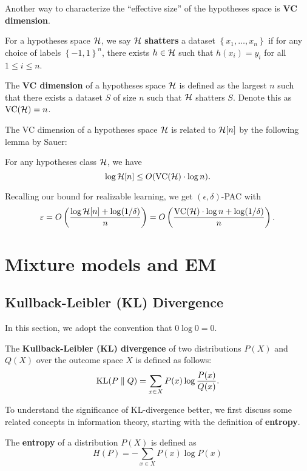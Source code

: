 \documentclass[a4paper]{article}
\begin{document}
Another way to characterize the ``effective size'' of the
hypotheses space is \textbf{VC dimension}.

\begin{defi}[VC dimension]
  For a hypotheses space $\mathcal{H}$, we say
  $\mathcal{H}$ \textbf{shatters} a dataset
  $\left\{ x_1, \dots, x_n \right\}$ if
  for any choice of labels
  $\left\{ -1, 1 \right\}^n$, there exists
  $h \in \mathcal{H}$ such that $h(x_i) = y_i$
  for all $1 \leq i \leq n$.

  The \textbf{VC dimension} of a hypotheses
  space $\mathcal{H}$ is defined
  as the largest $n$ such that there exists a dataset $S$
  of size $n$ such that $\mathcal{H}$ shatters $S$.
  Denote this as $\operatorname{VC}(\mathcal{H}) = n$.
\end{defi}

The VC dimension of a hypotheses space $\mathcal{H}$ is
related to $\mathcal{H}[n]$ by the following lemma by
Sauer:

\begin{thm}
  For any hypotheses class $\mathcal{H}$, we have
  \[
  \log \mathcal{H}[n] \leq O(\operatorname{VC}(\mathcal{H}) \cdot \log n).
  \]
\end{thm}

Recalling our bound for realizable learning, we get
$(\epsilon, \delta)$-PAC with
\[
\varepsilon = O \left( \frac{\log \mathcal{H}[n] + \log (1 / \delta)}{n} \right)
= O \left( \frac{\operatorname{VC}(\mathcal{H}) \cdot \log n + \log (1 / \delta)}{n} \right).
\]




\section{Mixture models and EM}

\subsection{Kullback-Leibler (KL) Divergence}
In this section, we adopt the convention that $0 \log 0 = 0$.

\begin{defi}[KL divergence]
  The \textbf{Kullback-Leibler (KL) divergence} of two
  distributions $P(X)$ and $Q(X)$
  over the outcome space $X$ is defined as follows:
  \[
  \operatorname{KL} (P \; \Vert \; Q) = \sum_{x \in X} P(x) \log \frac{P(x)}{Q(x)}.
  \]
\end{defi}

To understand the significance of KL-divergence better,
we first discuss some related concepts in information theory,
starting with the definition of \textbf{entropy}.
\begin{defi}
  The \textbf{entropy} of a distribution $P(X)$
  is defined as
  \[
  H(P) = - \sum_{x \in X} P(x) \log P(x)
  \]
\end{defi}
\end{document}
